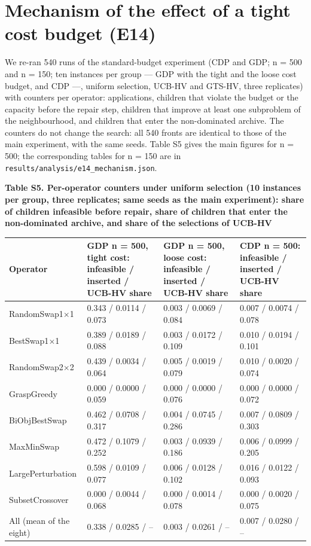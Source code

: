 \documentclass[final,3p,times,11pt,authoryear]{elsarticle}
\begin{document}
\section{Mechanism of the effect of a tight cost budget (E14)}

We re-ran 540 runs of the standard-budget experiment (CDP and GDP; n = 500 and n = 150; ten instances per group --- GDP with the tight and the loose cost budget, and CDP ---, uniform selection, UCB-HV and GTS-HV, three replicates) with counters per operator: applications, children that violate the budget or the capacity before the repair step, children that improve at least one subproblem of the neighbourhood, and children that enter the non-dominated archive. The counters do not change the search: all 540 fronts are identical to those of the main experiment, with the same seeds. Table S5 gives the main figures for n = 500; the corresponding tables for n = 150 are in \texttt{results/analysis/e14\_\allowbreak{}mechanism.json}.

\textbf{Table S5. Per-operator counters under uniform selection (10 instances per group, three replicates; same seeds as the main experiment): share of children infeasible before repair, share of children that enter the non-dominated archive, and share of the selections of UCB-HV}

\begin{center}
\scriptsize
\setlength{\tabcolsep}{4pt}
\begin{tabularx}{\linewidth}{lXXX}
\toprule
Operator & GDP n = 500, tight cost: infeasible / inserted / UCB-HV share & GDP n = 500, loose cost: infeasible / inserted / UCB-HV share & CDP n = 500: infeasible / inserted / UCB-HV share \\
\midrule
RandomSwap1$\times$1 & 0.343 / 0.0114 / 0.073 & 0.003 / 0.0069 / 0.084 & 0.007 / 0.0074 / 0.078 \\
BestSwap1$\times$1 & 0.389 / 0.0189 / 0.088 & 0.003 / 0.0172 / 0.109 & 0.010 / 0.0194 / 0.101 \\
RandomSwap2$\times$2 & 0.439 / 0.0034 / 0.064 & 0.005 / 0.0019 / 0.079 & 0.010 / 0.0020 / 0.074 \\
GraspGreedy & 0.000 / 0.0000 / 0.059 & 0.000 / 0.0000 / 0.076 & 0.000 / 0.0000 / 0.072 \\
BiObjBestSwap & 0.462 / 0.0708 / 0.317 & 0.004 / 0.0745 / 0.286 & 0.007 / 0.0809 / 0.303 \\
MaxMinSwap & 0.472 / 0.1079 / 0.252 & 0.003 / 0.0939 / 0.186 & 0.006 / 0.0999 / 0.205 \\
LargePerturbation & 0.598 / 0.0109 / 0.077 & 0.006 / 0.0128 / 0.102 & 0.016 / 0.0122 / 0.093 \\
SubsetCrossover & 0.000 / 0.0044 / 0.068 & 0.000 / 0.0014 / 0.078 & 0.000 / 0.0020 / 0.075 \\
All (mean of the eight) & 0.338 / 0.0285 / -- & 0.003 / 0.0261 / -- & 0.007 / 0.0280 / -- \\
\bottomrule
\end{tabularx}
\end{center}
\end{document}

